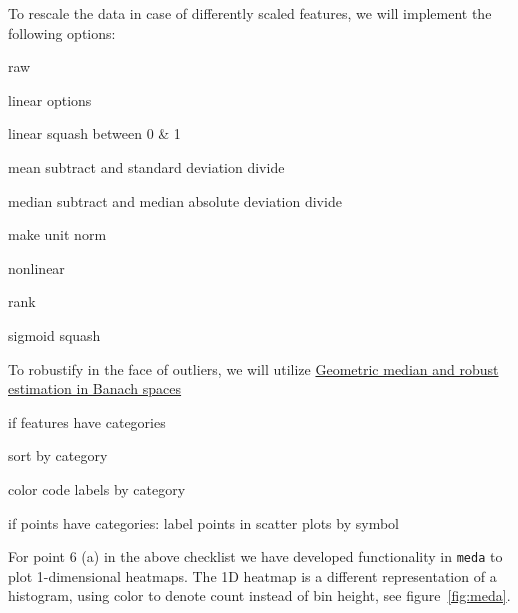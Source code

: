 \documentclass[simplex.tex]{subfiles}
\begin{document}
\begin{compactitem}
\item To rescale the data in case of differently scaled features, we will implement the following options: 
\begin{compactitem}
  \item raw
  \item linear options
  \begin{compactitem}
    \item linear squash between 0 \& 1
    \item mean subtract and standard deviation divide
    \item median subtract and median absolute deviation divide
    \item make unit norm
  \end{compactitem}
  \item nonlinear
  \begin{compactitem}
    \item rank
    \item sigmoid squash
  \end{compactitem}
\end{compactitem}

\item To robustify in the face of outliers, we will utilize
 \href{http://projecteuclid.org/euclid.bj/1438777595}{Geometric median and robust estimation in Banach spaces} 

\item { if features have categories}
\begin{compactenum}
  \item sort by category
  \item color code labels by category
\end{compactenum}

\item { if points have categories}: 
   label points in scatter plots by symbol
\end{compactitem}

\vspace{12pt}

For point 6 (a) in the above checklist we have developed functionality
in \verb+meda+ to plot 1-dimensional heatmaps.  The 1D heatmap is
a different representation of a histogram, using color to denote count
instead of bin height, see figure~\ref{fig:meda}.
\end{document}
